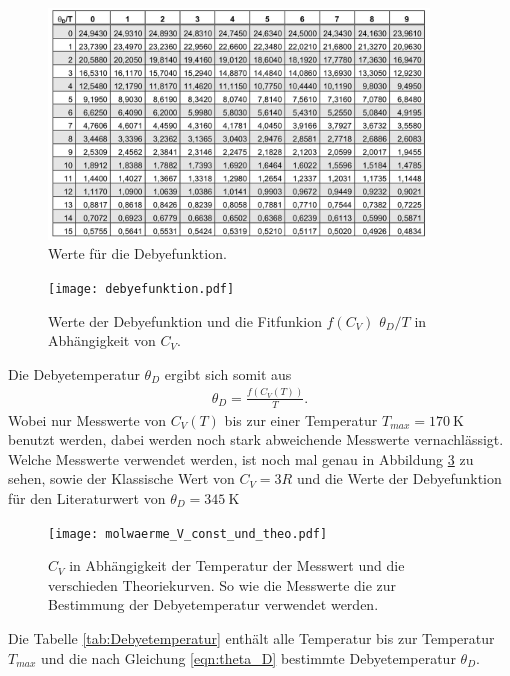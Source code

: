 \begin{figure}
 \centering
 \includegraphics[width=0.9\textwidth]{Debye.PNG}
   \caption{Werte für die Debyefunktion.}
   \label{fig:debye}
 \end{figure}

 \begin{figure}
  \centering
  \texttt{[image: debyefunktion.pdf]}
    \caption{Werte der Debyefunktion und die Fitfunkion $f(C_V)$ $\theta_D/T$ in Abhängigkeit von $C_V$.}
    \label{fig:debye}
  \end{figure}




Die Debyetemperatur $\theta_D$ ergibt sich somit aus
\begin{align}
  \theta_D = \frac{f(C_V(T))}{T}. \label{eqn:theta_D}
\end{align}
Wobei nur Messwerte von $C_V(T)$ bis zur einer Temperatur $T_{max}=\SI{170}{\kelvin} $ benutzt werden, dabei werden noch stark abweichende Messwerte vernachlässigt.
Welche Messwerte verwendet werden, ist noch mal genau in Abbildung \ref{fig:cool} zu sehen, sowie
der Klassische Wert von $C_V=3R$ und die Werte der Debyefunktion
für den Literaturwert von $\theta_D = \SI{345}{\kelvin}$  \cite{debyetemp}


\begin{figure}
 \centering
 \texttt{[image: molwaerme\_V\_const\_und\_theo.pdf]}
   \caption{ $C_V$ in Abhängigkeit der Temperatur der Messwert und die verschieden Theoriekurven. So wie die Messwerte die zur Bestimmung der Debyetemperatur verwendet werden.}
   \label{fig:cool}
 \end{figure}


Die Tabelle \ref{tab:Debyetemperatur} enthält alle
Temperatur bis zur Temperatur $T_{max}$ und die nach Gleichung \eqref{eqn:theta_D}
bestimmte Debyetemperatur $\theta_D$.

